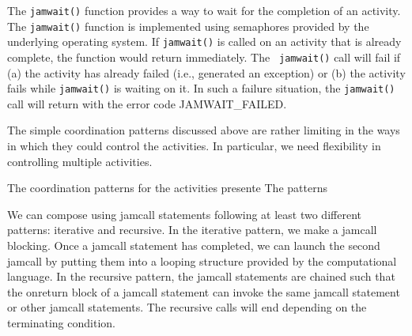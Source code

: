 \documentclass[11pt]{article}
\begin{document}

The {\tt jamwait()} function provides a way to wait for the completion of an
activity. The {\tt jamwait()} function is implemented using semaphores provided
by the underlying operating system. If {\tt jamwait()} is called on an activity
that is already complete, the function would return immediately. The {\tt
jamwait()} call will fail if (a) the activity has already failed (i.e.,
generated an exception) or (b) the activity fails while {\tt jamwait()} is
waiting on it.  In such a failure situation, the {\tt jamwait()} call will
return with the error code JAMWAIT\_FAILED.



The simple coordination patterns discussed above are rather limiting in the ways
in which they could control the activities. In particular, we need flexibility
in controlling multiple activities.







The coordination patterns for the activities presente
The patterns



We can compose using jamcall statements following at least two different
patterns: iterative and recursive. In the iterative pattern, we make a jamcall
blocking. Once a jamcall statement has completed, we can launch the second
jamcall by putting them into a looping structure provided by the computational
language. In the recursive pattern, the jamcall statements are chained such that
the onreturn block of a jamcall statement can invoke the same jamcall statement
or other jamcall statements. The recursive calls will end depending on the
terminating condition.
\end{document}
